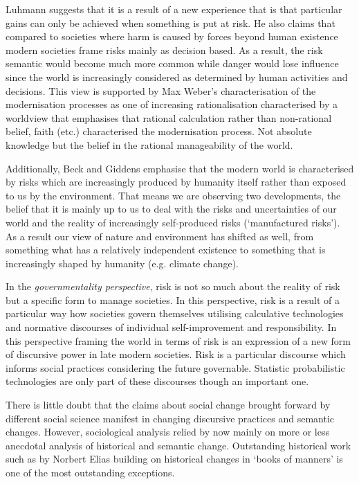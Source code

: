 \documentclass{report}
\begin{document}
Luhmann suggests that it is a result of a new experience that is that particular gains can only be achieved when something is put at risk. He also claims that compared to societies where harm is caused by forces beyond human existence modern societies frame risks mainly as decision based. As a result, the risk semantic would become much more common while danger would lose influence since the world is increasingly considered as determined by human activities and decisions. This view is supported by Max Weber's characterisation of the modernisation processes as one of increasing rationalisation characterised by a worldview that emphasises that rational calculation rather than non-rational belief, faith (etc.) characterised the modernisation process. Not absolute knowledge but the belief in the rational manageability of the world.

Additionally, Beck and Giddens emphasise that the modern world is characterised by risks which are increasingly produced by humanity itself rather than exposed to us by the environment. That means we are observing two developments, the belief that it is mainly up to us to deal with the risks and uncertainties of our world and the reality of increasingly self-produced risks (`manufactured risks'). As a result our view of nature and environment has shifted as well, from something what has a relatively independent existence to something that is increasingly shaped by humanity (e.g. climate change).

In the \emph{governmentality perspective}, risk is not so much about the reality of risk but a specific form to manage societies. In this perspective, risk is a result of a particular way how societies govern themselves utilising calculative technologies and normative discourses of individual self-improvement and responsibility. In this perspective framing the world in terms of risk is an expression of a new form of discursive power in late modern societies. Risk is a particular discourse which informs social practices considering the future governable. Statistic probabilistic technologies are only part of these discourses though an important one.

There is little doubt that the claims about social change brought forward by different social science manifest in changing discursive practices and semantic changes. However, sociological analysis relied by now mainly on more or less anecdotal analysis of historical and semantic change. Outstanding historical work such as by Norbert Elias building on historical changes in `books of manners' is one of the most outstanding exceptions. 
\end{document}
